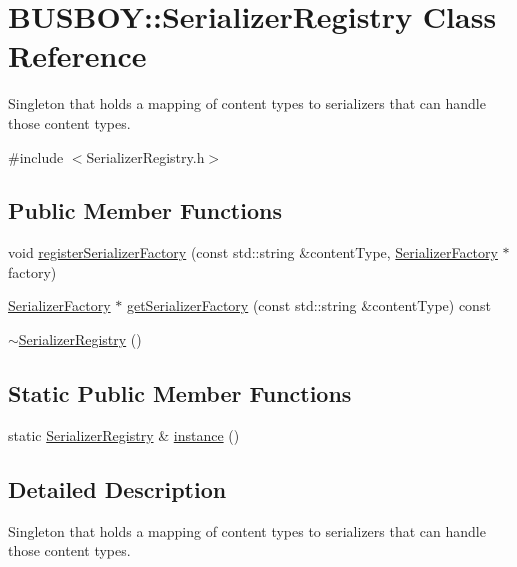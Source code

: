 \hypertarget{classBUSBOY_1_1SerializerRegistry}{
\section{BUSBOY::SerializerRegistry Class Reference}
\label{classBUSBOY_1_1SerializerRegistry}
}


Singleton that holds a mapping of content types to serializers that can handle those content types.  


{\ttfamily \#include $<$SerializerRegistry.h$>$}\subsection*{Public Member Functions}
\begin{DoxyCompactItemize}
\item 
void \hyperlink{classBUSBOY_1_1SerializerRegistry_aa380f8203820578477b1b0a6098683e3}{registerSerializerFactory} (const std::string \&contentType, \hyperlink{classBUSBOY_1_1SerializerFactory}{SerializerFactory} $\ast$factory)
\item 
\hyperlink{classBUSBOY_1_1SerializerFactory}{SerializerFactory} $\ast$ \hyperlink{classBUSBOY_1_1SerializerRegistry_ac0afae4f4ea9bb93d0fab518a9a801da}{getSerializerFactory} (const std::string \&contentType) const 
\item 
\hyperlink{classBUSBOY_1_1SerializerRegistry_a778ef3cd8813fe5cfb9679086e7024ec}{$\sim$SerializerRegistry} ()
\end{DoxyCompactItemize}
\subsection*{Static Public Member Functions}
\begin{DoxyCompactItemize}
\item 
static \hyperlink{classBUSBOY_1_1SerializerRegistry}{SerializerRegistry} \& \hyperlink{classBUSBOY_1_1SerializerRegistry_a680fd6bd55dd2cda503f6c86e1b45848}{instance} ()
\end{DoxyCompactItemize}


\subsection{Detailed Description}
Singleton that holds a mapping of content types to serializers that can handle those content types. 

